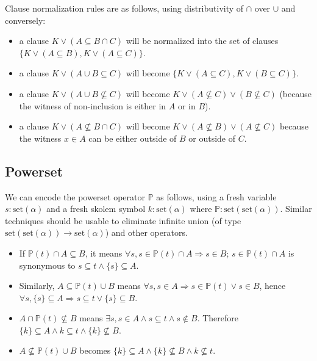 \documentclass{article}
\newcommand{\set}[1]{\ensuremath{\text{set}({#1})}}
\begin{document}
Clause normalization rules are as follows, using distributivity of $\cap$
over $\cup$ and conversely:
\begin{itemize}
\item a clause $K \lor (A \subseteq B \cap C)$ will be normalized into the
    set of clauses
    $\{ K \lor (A \subseteq B),  K \lor (A \subseteq C) \}$.
\item a clause $K \lor (A \cup B \subseteq C)$ will become
    $\{ K \lor (A \subseteq C) , K \lor (B \subseteq C) \}$.
\item a clause $K \lor (A \cup B \not\subseteq C)$ will become
    $K \lor (A \not\subseteq C) \lor (B \not\subseteq C)$ (because the witness
    of non-inclusion is either in $A$ or in $B$).
\item a clause $K \lor (A \not\subseteq B \cap C)$ will become
    $K \lor (A \not\subseteq B) \lor (A \not\subseteq C)$ because
    the witness $x \in A$ can be either outside of $B$ or outside of $C$.
\end{itemize}

\subsection{Powerset}
\noindent{}We can encode the powerset operator $\mathbb{P}$ as follows, using a fresh
variable $s:\set{\alpha}$ and a fresh skolem
symbol $k:\set{\alpha}$ where $\mathbb{P}: \set{\set{\alpha}}$. Similar
techniques should be usable to eliminate infinite
union (of type $\set{\set{\alpha}} \rightarrow \set{\alpha}$) and other operators.

\begin{itemize}
\item If $\mathbb{P}(t) \cap A \subseteq B$,
    it means $\forall s, s\in \mathbb{P}(t) \cap A \Rightarrow s \in B$;
    $s \in \mathbb{P}(t) \cap A$ is synonymous to $s \subseteq t \land
    \{ s \} \subseteq A$.
\item Similarly, $A \subseteq \mathbb{P}(t) \cup B$
    means $\forall s, s\in A \Rightarrow s \in \mathbb{P}(t) \lor s\in B$,
    hence $\forall s, \{s \}\subseteq A \Rightarrow s \subseteq t \lor \{ s \} \subseteq B$.
\item $A \cap \mathbb{P}(t) \not\subseteq B$ means
    $\exists s, s \in A \land s \subseteq t \land s \not\in B$.
    Therefore $\{k\} \subseteq A \land k \subseteq t \land \{k\} \not\subseteq B$.
\item $A \not\subseteq \mathbb{P}(t) \cup B$ becomes
    $\{ k\} \subseteq A \land \{k\} \not\subseteq B \land k \not\subseteq t$.
\end{itemize}
\end{document}
